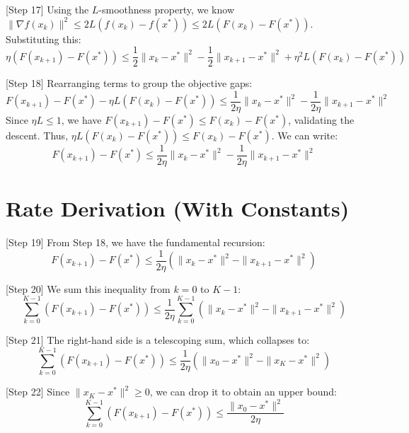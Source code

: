 \documentclass{article}
\begin{document}
[Step 17] Using the $L$-smoothness property, we know $\|\nabla f(x_k)\|^2 \leq 2L(f(x_k) - f(x^*)) \leq 2L(F(x_k) - F(x^*))$. Substituting this:
\begin{equation}
    \eta (F(x_{k+1}) - F(x^*)) \leq \frac{1}{2} \|x_k - x^*\|^2 - \frac{1}{2} \|x_{k+1} - x^*\|^2 + \eta^2 L (F(x_k) - F(x^*))
\end{equation}

[Step 18] Rearranging terms to group the objective gaps:
\begin{equation}
    F(x_{k+1}) - F(x^*) - \eta L (F(x_k) - F(x^*)) \leq \frac{1}{2\eta} \|x_k - x^*\|^2 - \frac{1}{2\eta} \|x_{k+1} - x^*\|^2
\end{equation}
Since $\eta L \leq 1$, we have $F(x_{k+1}) - F(x^*) \leq F(x_k) - F(x^*)$, validating the descent. Thus, $\eta L (F(x_k) - F(x^*)) \leq F(x_k) - F(x^*)$. We can write:
\begin{equation}
    F(x_{k+1}) - F(x^*) \leq \frac{1}{2\eta} \|x_k - x^*\|^2 - \frac{1}{2\eta} \|x_{k+1} - x^*\|^2
\end{equation}

\section*{Rate Derivation (With Constants)}
[Step 19] From Step 18, we have the fundamental recursion:
\begin{equation}
    F(x_{k+1}) - F(x^*) \leq \frac{1}{2\eta} \left( \|x_k - x^*\|^2 - \|x_{k+1} - x^*\|^2 \right)
\end{equation}

[Step 20] We sum this inequality from $k = 0$ to $K-1$:
\begin{equation}
    \sum_{k=0}^{K-1} \left( F(x_{k+1}) - F(x^*) \right) \leq \frac{1}{2\eta} \sum_{k=0}^{K-1} \left( \|x_k - x^*\|^2 - \|x_{k+1} - x^*\|^2 \right)
\end{equation}

[Step 21] The right-hand side is a telescoping sum, which collapses to:
\begin{equation}
    \sum_{k=0}^{K-1} \left( F(x_{k+1}) - F(x^*) \right) \leq \frac{1}{2\eta} \left( \|x_0 - x^*\|^2 - \|x_K - x^*\|^2 \right)
\end{equation}

[Step 22] Since $\|x_K - x^*\|^2 \geq 0$, we can drop it to obtain an upper bound:
\begin{equation}
    \sum_{k=0}^{K-1} \left( F(x_{k+1}) - F(x^*) \right) \leq \frac{\|x_0 - x^*\|^2}{2\eta}
\end{equation}
\end{document}
